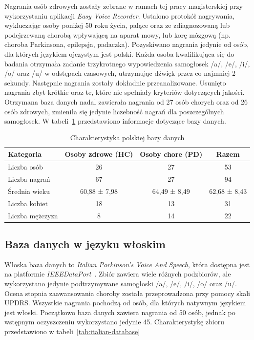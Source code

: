 Nagrania osób zdrowych zostały zebrane w ramach tej pracy magisterskiej przy wykorzystaniu aplikacji \emph{Easy Voice Recorder}.
Ustalono protokół nagrywania, wykluczając osoby poniżej 50 roku życia, palące oraz ze zdiagnozowaną lub podejrzewaną chorobą wpływającą na aparat mowy, lub korę mózgową (np.
choroba Parkinsona, epilepsja, padaczka).
Pozyskiwano nagrania jedynie od osób, dla których językiem ojczystym jest polski.
Każda osoba kwalifikująca się do badania otrzymała zadanie trzykrotnego wypowiedzenia samogłosek /a/, /e/, /i/, /o/ oraz /u/ w odstępach czasowych, utrzymując dźwięk przez co najmniej 2 sekundy.
Następnie nagrania zostały dokładnie przeanalizowane.
Usunięto nagrania zbyt krótkie oraz te, które nie spełniały kryteriów dotyczących jakości.
Otrzymana baza danych nadal zawierała nagrania od 27 osób chorych oraz od 26 osób zdrowych, zmieniła się jedynie liczebność nagrań dla poszczególnych samogłosek.
W tabeli~\ref{tab:polish_database} przedstawiono informacje dotyczące bazy danych.

\begin{table}[h]
\centering
\caption{Charakterystyka polskiej bazy danych}
\label{tab:polish_database}
\begin{tabular}{|l|c|c|c|}
\hline
\textbf{Kategoria} &\textbf{Osoby zdrowe (HC)} &\textbf{Osoby chore (PD)} &\textbf{Razem} \\ \hline
Liczba osób &26 &27 &53\\ \hline
Liczba nagrań &67 &27 &94\\ \hline
Średnia wieku &60,88 ± 7,98 &64,49 ± 8,49  &62,68 ± 8,43\\ \hline
Liczba kobiet &18 &13 &31\\ \hline
Liczba mężczyzn &8 &14 &22 \\ \hline
\end{tabular}
\end{table}

\subsection{Baza danych w języku włoskim}
\label{subsec:wloska-baza}

Włoska baza danych to \emph{Italian Parkinson's Voice And Speech}, która dostępna jest na platformie \emph{IEEEDataPort}~\cite{italian-database}.
Zbiór zawiera wiele różnych podzbiorów, ale wykorzystano jedynie podtrzymywane samogłoski /a/, /e/, /i/, /o/ oraz /u/.
Ocena stopnia zaawansowania choroby została przeprowadzona przy pomocy skali UPDRS\@.
Wszystkie nagrania pochodzą od osób, dla których natywnym językiem jest włoski.
Początkowo baza danych zawiera nagrania od 50 osób, jednak po wstępnym oczyszczeniu wykorzystano jedynie 45.
Charakterystykę zbioru przedstawiono w tabeli~\ref{tab:italian-database}

